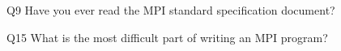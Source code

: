 \begin{description}%
\item{Q9} Have you ever read the MPI standard specification document?%
\item{Q15} What is the most difficult part of writing an MPI program?%
\end{description}%
